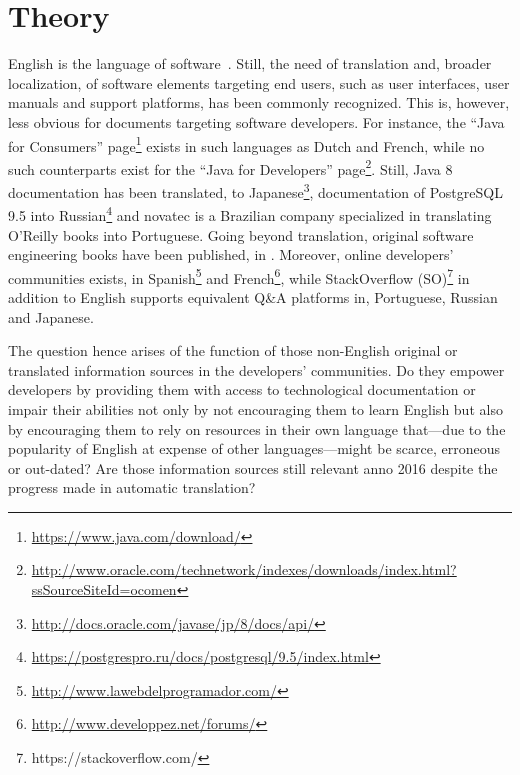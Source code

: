 \section{Theory}
English is the language of software~\cite{Carmel}.
Still, the need of translation and, broader localization, of software elements targeting end users, such as user interfaces, user manuals and support platforms, has been commonly recognized. 
This is, however, less obvious for documents targeting software developers.
For instance, the ``Java for Consumers'' page\footnote{\url{https://www.java.com/download/}}
exists in such languages as Dutch and French, while no such counterparts exist for the ``Java for Developers'' page\footnote{\url{http://www.oracle.com/technetwork/indexes/downloads/index.html?ssSourceSiteId=ocomen}}. 
Still, Java 8 documentation has been translated, \eg to Japanese\footnote{\url{http://docs.oracle.com/javase/jp/8/docs/api/}}, documentation of PostgreSQL 9.5 into Russian\footnote{\url{https://postgrespro.ru/docs/postgresql/9.5/index.html}} and novatec is a Brazilian company specialized in translating O'Reilly books into Portuguese.
Going beyond translation, original software engineering books have been published, \eg in . 
Moreover, online developers' communities exists, \eg in Spanish\footnote{\url{http://www.lawebdelprogramador.com/}} and French\footnote{\url{http://www.developpez.net/forums/}}, while StackOverflow (SO)\footnote{https://stackoverflow.com/} in addition to English supports equivalent Q\&A platforms in, \eg Portuguese, Russian and Japanese. 

The question hence arises of the function of those non-English original or translated information sources in
the developers' communities. 
Do they empower developers by providing them with access to technological documentation or impair their abilities not only by not encouraging them to learn English but also by encouraging them to rely on resources in their own language that---due to the popularity of English at expense of other languages---might be scarce, erroneous or out-dated? 
Are those information sources still relevant anno 2016 despite the progress made in automatic translation? 

